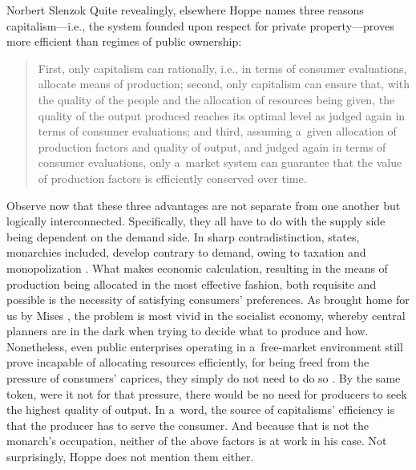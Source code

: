 \begin{artengenv}{Norbert Slenzok}
Quite revealingly, elsewhere Hoppe 
\parencite*[][p.192]{hoppe_theory_2016} %
 names three reasons capitalism---i.e., the system founded upon respect for private property---proves more efficient than regimes of public ownership:



\begin{quote}
First, only capitalism can rationally, i.e., in terms of consumer evaluations, allocate means of production; second, only capitalism can ensure that, with the quality of the people and the allocation of resources being given, the quality of the output produced reaches its optimal level as judged again in terms of consumer evaluations; and third, assuming a~given allocation of production factors and quality of output, and judged again in terms of consumer evaluations, only a~market system can guarantee that the value of production factors is efficiently conserved over time.
\end{quote}



Observe now that these three advantages are not separate from one another but logically interconnected. Specifically, they all have to do with the supply side being dependent on the demand side. In sharp contradistinction, states, monarchies included, develop contrary to demand, owing to taxation and monopolization 
\parencite[][pp.49–52]{hoppe_economics_2006}. %
 What makes economic calculation, resulting in the means of production being allocated in the most effective fashion, both requisite and possible is the necessity of satisfying consumers' preferences. As brought home for us by Mises 
\parencite*[][]{mises_economic_2012}, %
 the problem is most vivid in the socialist economy, whereby central planners are in the dark when trying to decide what to produce and how. Nonetheless, even public enterprises operating in a~free-market environment still prove incapable of allocating resources efficiently, for being freed from the pressure of consumers' caprices, they simply do not need to do so 
\parencites[][]{mises_bureaucracy_1944}[][pp.952–953]{rothbard_man_2009}. %
 By the same token, were it not for that pressure, there would be no need for producers to seek the highest quality of output. In a~word, the source of capitalisms' efficiency is that the producer has to serve the consumer. And because that is not the monarch's occupation, neither of the above factors is at work in his case. Not surprisingly, Hoppe does not mention them either.




\end{artengenv}
